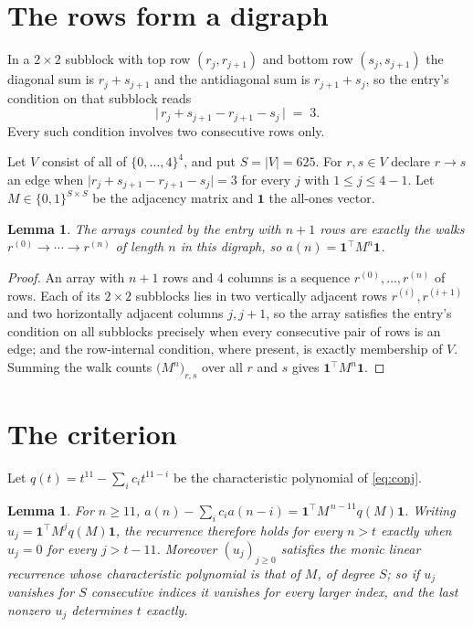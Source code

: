 \documentclass[11pt,a4paper]{article}
\theoremstyle{plain}
\newtheorem{lemma}[theorem]{Lemma}
\theoremstyle{definition}
\begin{document}
\section{The rows form a digraph}

In a $2\times2$ subblock with top row $(r_j,r_{j+1})$ and bottom row $(s_j,s_{j+1})$ the
diagonal sum is $r_j+s_{j+1}$ and the antidiagonal sum is $r_{j+1}+s_j$, so the entry's
condition on that subblock reads
\[
\bigl|\,r_j+s_{j+1}-r_{j+1}-s_j\,\bigr|\;=\;3.
\]
Every such condition involves two consecutive rows only.

Let $V$ consist of all of $\{0,\dots,4\}^{4}$, and put $S=|V|=625$. For $r,s\in V$ declare $r\to s$ an edge
when $\bigl|r_j+s_{j+1}-r_{j+1}-s_j\bigr|=3$ for every $j$ with
$1\le j\le4-1$. Let $M\in\{0,1\}^{S\times S}$ be the adjacency matrix and $\mathbf{1}$
the all-ones vector.

\begin{lemma}\label{lem:walk}
The arrays counted by the entry with $n+1$ rows are exactly the walks
$r^{(0)}\to\cdots\to r^{(n)}$ of length $n$ in this digraph, so
$a(n)=\mathbf{1}^{\!\top}M^{n}\mathbf{1}$.
\end{lemma}

\begin{proof}
An array with $n+1$ rows and $4$ columns is a sequence $r^{(0)},\dots,r^{(n)}$ of
rows. Each of its $2\times2$ subblocks lies in two vertically adjacent rows
$r^{(i)},r^{(i+1)}$ and two horizontally adjacent columns $j,j+1$, so the array satisfies
the entry's condition on all subblocks precisely when every consecutive pair of rows is an
edge; and the row-internal condition, where present, is exactly membership of $V$. Summing
the walk counts $\bigl(M^{n}\bigr)_{r,s}$ over all $r$ and $s$ gives
$\mathbf{1}^{\!\top}M^{n}\mathbf{1}$.
\end{proof}

\section{The criterion}

Let $q(t)=t^{11}-\sum_i c_i t^{11-i}$ be the characteristic polynomial of
\eqref{eq:conj}.

\begin{lemma}\label{lem:crit}
For $n\ge11$,
$a(n)-\sum_i c_i a(n-i)=\mathbf{1}^{\!\top}M^{\,n-11}q(M)\mathbf{1}$. Writing
$u_j=\mathbf{1}^{\!\top}M^{j}q(M)\mathbf{1}$, the recurrence therefore holds for every
$n>t$ exactly when $u_j=0$ for every $j>t-11$. Moreover $(u_j)_{j\ge0}$ satisfies the
monic linear recurrence whose characteristic polynomial is that of $M$, of degree $S$; so
if $u_j$ vanishes for $S$ consecutive indices it vanishes for every larger index, and the
last nonzero $u_j$ determines $t$ exactly.
\end{lemma}
\end{document}

